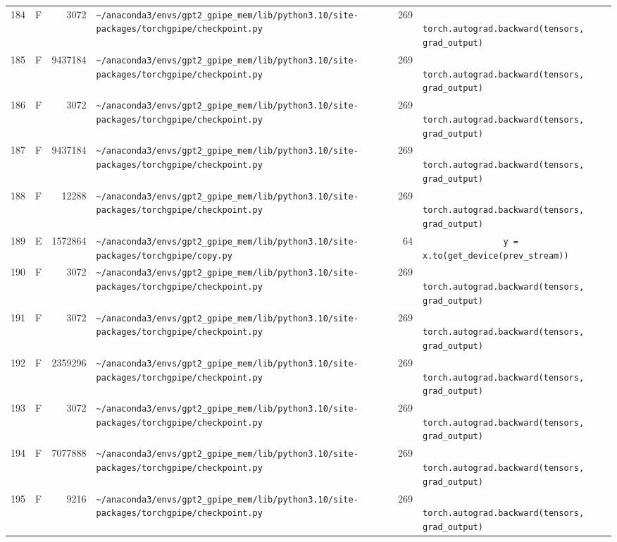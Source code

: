 \documentclass{article}
\begin{document}
\begin{longtable}{r l r p{6.5cm} r p{7.0cm}}
184 & F & 3072 & \lstinline|~/anaconda3/envs/gpt2_gpipe_mem/lib/python3.10/site-packages/torchgpipe/checkpoint.py| & 269 & \lstinline|            torch.autograd.backward(tensors, grad_output)| \\
185 & F & 9437184 & \lstinline|~/anaconda3/envs/gpt2_gpipe_mem/lib/python3.10/site-packages/torchgpipe/checkpoint.py| & 269 & \lstinline|            torch.autograd.backward(tensors, grad_output)| \\
186 & F & 3072 & \lstinline|~/anaconda3/envs/gpt2_gpipe_mem/lib/python3.10/site-packages/torchgpipe/checkpoint.py| & 269 & \lstinline|            torch.autograd.backward(tensors, grad_output)| \\
187 & F & 9437184 & \lstinline|~/anaconda3/envs/gpt2_gpipe_mem/lib/python3.10/site-packages/torchgpipe/checkpoint.py| & 269 & \lstinline|            torch.autograd.backward(tensors, grad_output)| \\
188 & F & 12288 & \lstinline|~/anaconda3/envs/gpt2_gpipe_mem/lib/python3.10/site-packages/torchgpipe/checkpoint.py| & 269 & \lstinline|            torch.autograd.backward(tensors, grad_output)| \\
189 & E & 1572864 & \lstinline|~/anaconda3/envs/gpt2_gpipe_mem/lib/python3.10/site-packages/torchgpipe/copy.py| & 64 & \lstinline|                y = x.to(get_device(prev_stream))| \\
190 & F & 3072 & \lstinline|~/anaconda3/envs/gpt2_gpipe_mem/lib/python3.10/site-packages/torchgpipe/checkpoint.py| & 269 & \lstinline|            torch.autograd.backward(tensors, grad_output)| \\
191 & F & 3072 & \lstinline|~/anaconda3/envs/gpt2_gpipe_mem/lib/python3.10/site-packages/torchgpipe/checkpoint.py| & 269 & \lstinline|            torch.autograd.backward(tensors, grad_output)| \\
192 & F & 2359296 & \lstinline|~/anaconda3/envs/gpt2_gpipe_mem/lib/python3.10/site-packages/torchgpipe/checkpoint.py| & 269 & \lstinline|            torch.autograd.backward(tensors, grad_output)| \\
193 & F & 3072 & \lstinline|~/anaconda3/envs/gpt2_gpipe_mem/lib/python3.10/site-packages/torchgpipe/checkpoint.py| & 269 & \lstinline|            torch.autograd.backward(tensors, grad_output)| \\
194 & F & 7077888 & \lstinline|~/anaconda3/envs/gpt2_gpipe_mem/lib/python3.10/site-packages/torchgpipe/checkpoint.py| & 269 & \lstinline|            torch.autograd.backward(tensors, grad_output)| \\
195 & F & 9216 & \lstinline|~/anaconda3/envs/gpt2_gpipe_mem/lib/python3.10/site-packages/torchgpipe/checkpoint.py| & 269 & \lstinline|            torch.autograd.backward(tensors, grad_output)| \\

\end{longtable}
\end{document}
